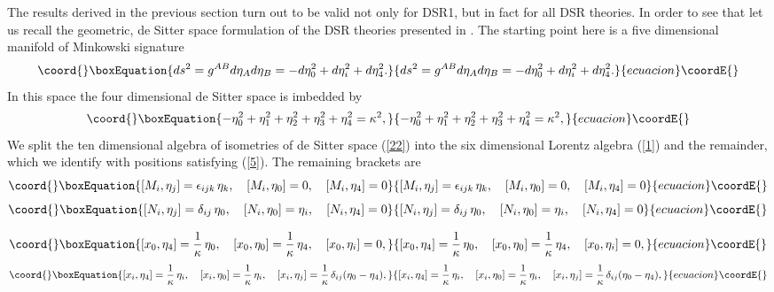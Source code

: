 \documentclass  [12pt] {article}
\begin{document}
The results derived in the previous section turn out to be valid not only for
DSR1, but in fact for all DSR theories. In order to see that let us recall the
geometric, de Sitter space formulation of the DSR theories presented in
\cite{Kowalski-Glikman:2002ft}. The starting point here is a five dimensional
manifold of Minkowski signature
\begin{equation}\coord{}\boxEquation{\label{21}
ds^2 = g^{AB}d\eta_A d\eta_B = -d\eta_0^2 + d\eta_i^2 + d\eta_4^2.
}{ds^2 = g^{AB}d\eta_A d\eta_B = -d\eta_0^2 + d\eta_i^2 + d\eta_4^2.
}{ecuacion}\coordE{}\end{equation}
In this space the four dimensional de Sitter space is imbedded by
\begin{equation}\coord{}\boxEquation{\label{22}
 -\eta_0^2 + \eta_1^2+ \eta_2^2+ \eta_3^2+ \eta_4^2 =\kappa^2,
}{-\eta_0^2 + \eta_1^2+ \eta_2^2+ \eta_3^2+ \eta_4^2 =\kappa^2,
}{ecuacion}\coordE{}\end{equation}
We split the ten dimensional algebra of isometries of de Sitter space
(\ref{22}) into the six dimensional Lorentz algebra (\ref{1}) and the
remainder, which we identify with positions \coordHE{} satisfying (\ref{5}). The
remaining brackets are
\begin{equation}\coord{}\boxEquation{\label{23}
 [M_i, \eta_j] = \epsilon_{ijk}\, \eta_k, \quad [M_i,
 \eta_0]=0,\quad
[M_i, \eta_4] =0
}{[M_i, \eta_j] = \epsilon_{ijk}\, \eta_k, \quad [M_i,
 \eta_0]=0,\quad
[M_i, \eta_4] =0
}{ecuacion}\coordE{}\end{equation}
\begin{equation}\coord{}\boxEquation{\label{24}
 [N_i,\eta_j] =  \delta_{ij}\, \eta_0, \quad [N_i, \eta_0] =  \eta_i,\quad [N_i, \eta_4] =0
}{[N_i,\eta_j] =  \delta_{ij}\, \eta_0, \quad [N_i, \eta_0] =  \eta_i,\quad [N_i, \eta_4] =0
}{ecuacion}\coordE{}\end{equation}

\begin{equation}\coord{}\boxEquation{\label{25}
  [x_0,\eta_4] = \frac{1}\kappa\, \eta_0, \quad [x_0,\eta_0]
= \frac{1}\kappa\, \eta_4, \quad [x_0,\eta_i] = 0,
}{[x_0,\eta_4] = \frac{1}\kappa\, \eta_0, \quad [x_0,\eta_0]
= \frac{1}\kappa\, \eta_4, \quad [x_0,\eta_i] = 0,
}{ecuacion}\coordE{}\end{equation}
\begin{equation}\coord{}\boxEquation{\label{26}
  [x_i, \eta_4] =\frac{1}\kappa\, \eta_i, \quad [x_i, \eta_0] =\frac{1}\kappa\, \eta_i, \quad
  [x_i, \eta_j] = \frac{1}\kappa\,
\delta_{ij}(\eta_0 - \eta_4),
}{[x_i, \eta_4] =\frac{1}\kappa\, \eta_i, \quad [x_i, \eta_0] =\frac{1}\kappa\, \eta_i, \quad
  [x_i, \eta_j] = \frac{1}\kappa\,
\delta_{ij}(\eta_0 - \eta_4),
}{ecuacion}\coordE{}\end{equation}
\end{document}
